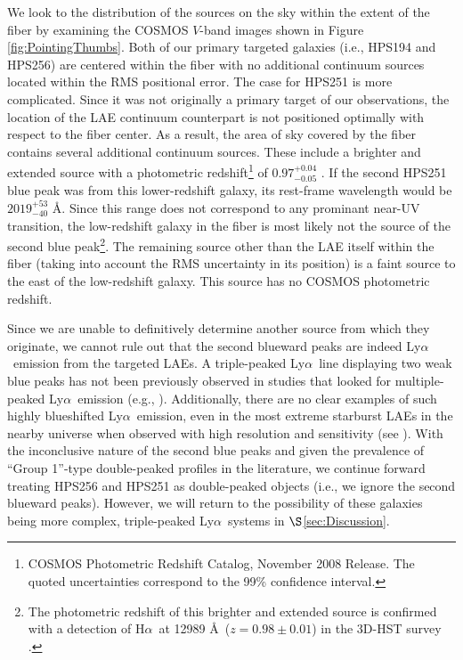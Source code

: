 \documentclass{emulateapj}
\newcommand{\lya}{Ly$\alpha$}
\newcommand{\ha}{H$\alpha$}
\begin{document}
We look to the distribution of the sources on the sky within the extent of the fiber by examining the COSMOS $V$-band images shown in Figure \ref{fig:PointingThumbs}. Both of our primary targeted galaxies (i.e., HPS194 and HPS256) are centered within the fiber with no additional continuum sources located within the RMS positional error. The case for HPS251 is more complicated. Since it was not originally a primary target of our observations, the location of the LAE continuum counterpart is not positioned optimally with respect to the fiber center. As a result, the area of sky covered by the fiber contains several additional continuum sources. These include a brighter and extended source with a photometric redshift\footnote[10]{COSMOS Photometric Redshift Catalog, November 2008 Release. The quoted uncertainties correspond to the 99\% confidence interval.} of $0.97_{-0.05}^{+0.04}$ \citep{ilbert2009}. If the second HPS251 blue peak was from this lower-redshift galaxy, its rest-frame wavelength would be $2019_{-40}^{+53}$ \AA. Since this range does not correspond to any prominant near-UV transition, the low-redshift galaxy in the fiber is most likely not the source of the second blue peak\footnote[11]{The photometric redshift of this brighter and extended source is confirmed with a detection of \ha\ at 12989 \AA\ ($z=0.98\pm0.01$) in the 3D-HST survey \citep{brammer2012}.}. The remaining source other than the LAE itself within the fiber (taking into account the RMS uncertainty in its position) is a faint source to the east of the low-redshift galaxy. This source has no COSMOS photometric redshift. 

Since we are unable to definitively determine another source from which they originate, we cannot rule out that the second blueward peaks are indeed \lya\ emission from the targeted LAEs. A triple-peaked \lya\ line displaying two weak blue peaks has not been previously observed in studies that looked for multiple-peaked \lya\ emission (e.g., \citealp{kulas2012,yamada2012}). Additionally, there are no clear examples of such highly blueshifted \lya\ emission, even in the most extreme starburst LAEs in the nearby universe when observed with high resolution and sensitivity (see \citealp{heckman2011}). With the inconclusive nature of the second blue peaks and given the prevalence of ``Group 1''-type double-peaked profiles in the literature, we continue forward treating HPS256 and HPS251 as double-peaked objects (i.e., we ignore the second blueward peaks). However, we will return to the possibility of these galaxies being more complex, triple-peaked \lya\ systems in $\S$\ref{sec:Discussion}.
\end{document}
